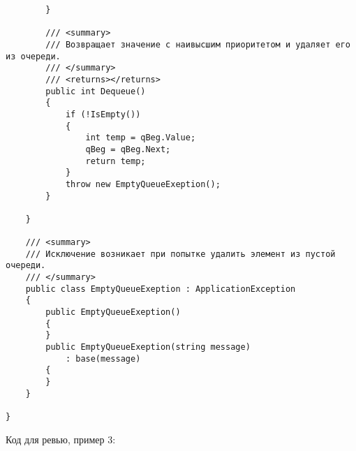 \documentclass[a5paper]{article}
\begin{document}
\begin{verbatim}
        }

        /// <summary>
        /// Возвращает значение с наивысшим приоритетом и удаляет его из очереди.
        /// </summary>
        /// <returns></returns>
        public int Dequeue()
        {
            if (!IsEmpty())
            {
                int temp = qBeg.Value;
                qBeg = qBeg.Next;
                return temp;
            }
            throw new EmptyQueueExeption();
        }

    }

    /// <summary>
    /// Исключение возникает при попытке удалить элемент из пустой очереди.
    /// </summary>
    public class EmptyQueueExeption : ApplicationException
    {
        public EmptyQueueExeption()
        {
        }
        public EmptyQueueExeption(string message)
            : base(message)
        {
        }
    }

}
\end{verbatim}

Код для ревью, пример 3:
\end{document}
